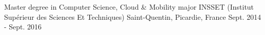 

\begin{cventries}

  \cventry
    {Master degree in Computer Science, Cloud \& Mobility major} %
    {INSSET (Institut Supérieur des Sciences Et Techniques)} %
    {Saint-Quentin, Picardie, France} %
    {Sept. 2014 - Sept. 2016} %
    {}
\end{cventries}
